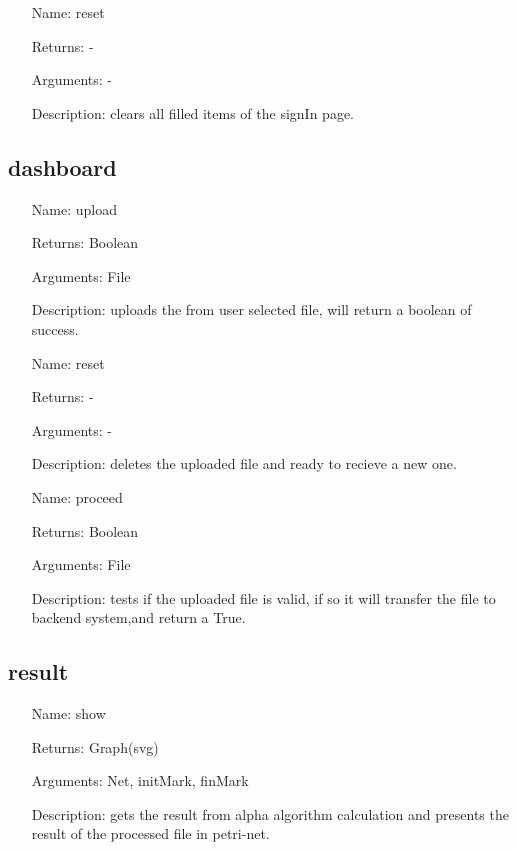 \documentclass[runningheads]{llncs}
\begin{document}
\begin{itemize}
	\item[Name:] reset
	\item[Returns:] -
	\item[Arguments:] -
	\item[Description:] clears all filled items of the signIn page.
\end{itemize}

\subsection{dashboard}
\begin{itemize}
	\item[Name:] upload
	\item[Returns:] Boolean
	\item[Arguments:] File
	\item[Description:] uploads the from user selected file, will return a boolean of success.
\end{itemize}

\begin{itemize}
	\item[Name:] reset
	\item[Returns:] -
	\item[Arguments:] -
	\item[Description:] deletes the uploaded file and ready to recieve a new one.
\end{itemize}

\begin{itemize}
	\item[Name:] proceed
	\item[Returns:] Boolean
	\item[Arguments:] File
	\item[Description:] tests if the uploaded file is valid, if so it will transfer the file to backend system,and return a True.
\end{itemize}

\subsection{result}
\begin{itemize}
	\item[Name:] show
	\item[Returns:] Graph(svg)
	\item[Arguments:] Net, initMark, finMark
	\item[Description:] gets the result from alpha algorithm calculation and presents the result of the processed file in petri-net.
\end{itemize}
\end{document}
